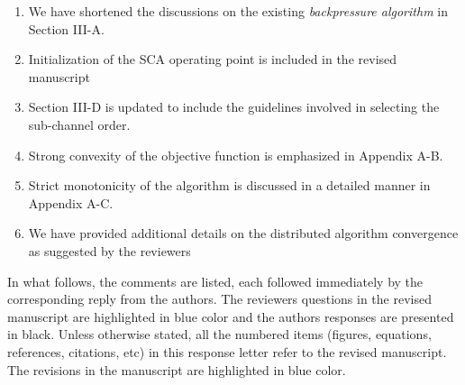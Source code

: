 \begin{enumerate}
\item We have shortened the discussions on the existing \textit{backpressure algorithm} in Section III-A.
\item Initialization of the \ac{SCA} operating point is included in the revised manuscript
\item Section III-D is updated to include the guidelines involved in selecting the sub-channel order.
\item Strong convexity of the objective function is emphasized in Appendix A-B.
\item Strict monotonicity of the algorithm is discussed in a detailed manner in Appendix A-C.
\item We have provided additional details on the distributed algorithm convergence as suggested by the reviewers
\end{enumerate}

In what follows, the comments are listed, each followed immediately by the corresponding reply from the authors. The reviewers questions in the revised manuscript are highlighted in blue color and the authors responses are presented in black. Unless otherwise stated, all the numbered items (figures, equations, references, citations, etc) in this response letter refer to the revised manuscript. The revisions in the manuscript are highlighted in blue color.